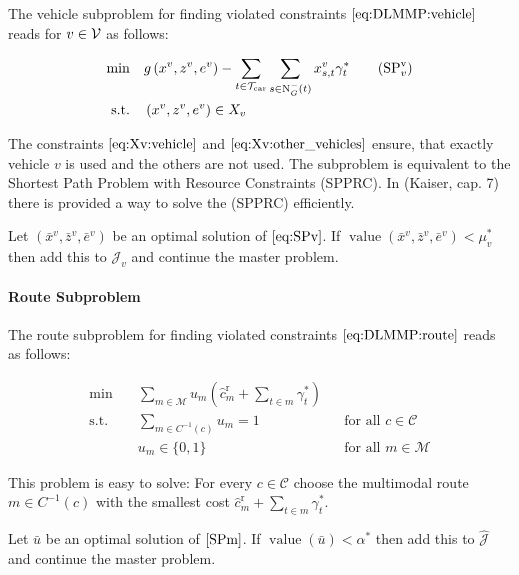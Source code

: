 The vehicle subproblem for finding violated constraints $\eqref{eq:DLMMP:vehicle}$ reads for $v\in\mathcal{V}$ as follows:

\begin{align*}
	\min \quad & g\left(x^v,z^v,e^v\right)-\sum_{t\in\Tcar}\sum_{s\in\Nin(t)}x^v_{s,t}\gamma^*_t \tag{$\SPv_v$} \label{eq:SPv} \\
	\text{s.t.} \quad & \left(x^v,z^v,e^v\right)\in X_v
\end{align*}

The constraints $\eqref{eq:Xv:vehicle}$ and $\eqref{eq:Xv:other_vehicles}$ ensure, that exactly vehicle $v$ is used and the others are not used. The subproblem is equivalent to the Shortest Path Problem with Resource Constraints (SPPRC). In (Kaiser, cap. 7) there is provided a way to solve the (SPPRC) efficiently.

Let $\left(\bar{x}^v,\bar{z}^v,\bar{e}^v\right)$ be an optimal solution of $\eqref{eq:SPv}$. If $\operatorname{value}\left(\bar{x}^v,\bar{z}^v,\bar{e}^v\right)<\mu_v^*$ then add this to $\mathcal{J}_v$ and continue the master problem.

\paragraph{Route Subproblem} \parfill

The route subproblem for finding violated constraints $\eqref{eq:DLMMP:route}$ reads as follows:

\begin{align*}
	\min \quad & \sum_{m\in\mathcal{M}}u_m\left(\hat{c}^{\operatorname{r}}_m + \sum_{t\in m}\gamma^*_t\right) \tag{$\SPm$} \label{SPm} \\
	\text{s.t.} \quad & \sum_{m\in C^{-1}(c)}u_m = 1 && \text{for all } c\in\mathcal{C} \\
	& u_m\in\{0,1\} && \text{for all } m\in\mathcal{M}
\end{align*}

This problem is easy to solve: For every $c\in\mathcal{C}$ choose the multimodal route $m\in C^{-1}(c)$ with the smallest cost $\hat{c}^{\operatorname{r}}_m + \sum_{t\in m}\gamma^*_t$. 

Let $\bar{u}$ be an optimal solution of $\eqref{SPm}$. If $\operatorname{value}\left(\bar{u}\right)<\alpha^*$ then add this to $\hat{\mathcal{J}}$ and continue the master problem.